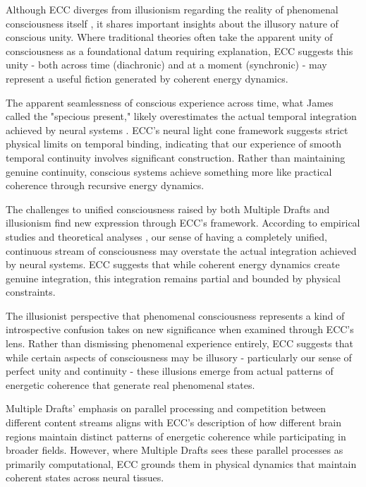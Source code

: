 Although ECC diverges from illusionism regarding the reality of phenomenal consciousness itself \cite{Frankish2019}, it shares important insights about the illusory nature of conscious unity. Where traditional theories often take the apparent unity of consciousness as a foundational datum requiring explanation, ECC suggests this unity - both across time (diachronic) and at a moment (synchronic) - may represent a useful fiction generated by coherent energy dynamics.

The apparent seamlessness of conscious experience across time, what James called the "specious present," likely overestimates the actual temporal integration achieved by neural systems \cite{VanGulick2018}. ECC's neural light cone framework suggests strict physical limits on temporal binding, indicating that our experience of smooth temporal continuity involves significant construction. Rather than maintaining genuine continuity, conscious systems achieve something more like practical coherence through recursive energy dynamics.

The challenges to unified consciousness raised by both Multiple Drafts and illusionism find new expression through ECC's framework. According to empirical studies and theoretical analyses \cite{Schwitzgebel2011}, our sense of having a completely unified, continuous stream of consciousness may overstate the actual integration achieved by neural systems. ECC suggests that while coherent energy dynamics create genuine integration, this integration remains partial and bounded by physical constraints.

The illusionist perspective that phenomenal consciousness represents a kind of introspective confusion \cite{Frankish2016} takes on new significance when examined through ECC's lens. Rather than dismissing phenomenal experience entirely, ECC suggests that while certain aspects of consciousness may be illusory - particularly our sense of perfect unity and continuity - these illusions emerge from actual patterns of energetic coherence that generate real phenomenal states.

Multiple Drafts' emphasis on parallel processing and competition between different content streams \cite{Dennett1992} aligns with ECC's description of how different brain regions maintain distinct patterns of energetic coherence while participating in broader fields. However, where Multiple Drafts sees these parallel processes as primarily computational, ECC grounds them in physical dynamics that maintain coherent states across neural tissues.

